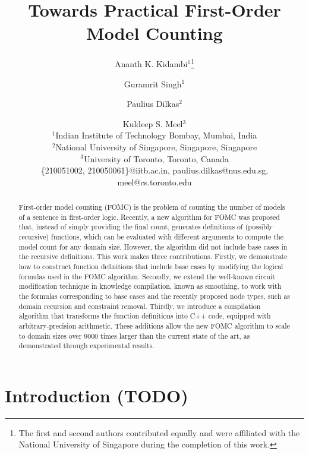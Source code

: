 \documentclass{article}
\title{Towards Practical First-Order Model Counting}
\author{%
  Ananth K. Kidambi$^1$\footnote{The first and second authors contributed equally and were affiliated with the National University of Singapore during the completion of this work.}\and
Guramrit Singh$^1$\and
Paulius Dilkas$^2$\and
Kuldeep S. Meel$^3$ \\
\affiliations
$^1$Indian Institute of Technology Bombay, Mumbai, India\\
$^2$National University of Singapore, Singapore, Singapore\\
$^3$University of Toronto, Toronto, Canada\\
\emails
\{210051002, 210050061\}@iitb.ac.in,
paulius.dilkas@nus.edu.sg,
meel@cs.toronto.edu
}
\theoremstyle{definition}
\begin{document}
\maketitle

\begin{abstract}
  First-order model counting (FOMC) is the problem of counting the number of
  models of a sentence in first-order logic. Recently, a new algorithm for FOMC
  was proposed that, instead of simply providing the final count, generates
  definitions of (possibly recursive) functions, which can be evaluated with
  different arguments to compute the model count for any domain size. However,
  the algorithm did not include base cases in the recursive definitions. This
  work makes three contributions. Firstly, we demonstrate how to construct
  function definitions that include base cases by modifying the logical formulas
  used in the FOMC algorithm. Secondly, we extend the well-known circuit
  modification technique in knowledge compilation, known as smoothing, to work
  with the formulas corresponding to base cases and the recently proposed node
  types, such as domain recursion and constraint removal. Thirdly, we introduce
  a compilation algorithm that transforms the function definitions into C++
  code, equipped with arbitrary-precision arithmetic. These additions allow the
  new FOMC algorithm to scale to domain sizes over \num{9000} times larger than
  the current state of the art, as demonstrated through experimental results.
\end{abstract}

\section{Introduction (TODO)}

\end{document}
